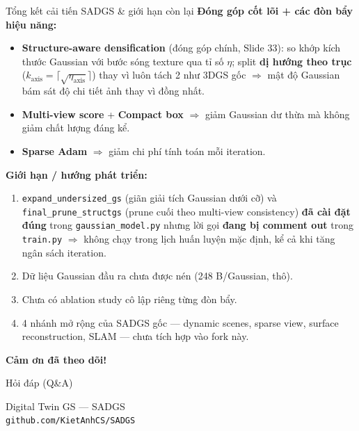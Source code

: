 \begin{frame}{Tổng kết cải tiến SADGS \& giới hạn còn lại}
\footnotesize
\textbf{Đóng góp cốt lõi + các đòn bẩy hiệu năng:}
\begin{itemize}
    \item \textbf{Structure-aware densification} (đóng góp chính, Slide 33): so khớp kích thước Gaussian với bước sóng texture qua tỉ số $\eta$; split \textbf{dị hướng theo trục} ($k_{\text{axis}}=\lceil\sqrt{\eta_{\text{axis}}}\rceil$) thay vì luôn tách 2 như 3DGS gốc $\Rightarrow$ mật độ Gaussian bám sát độ chi tiết ảnh thay vì đồng nhất.
    \item \textbf{Multi-view score} + \textbf{Compact box} $\Rightarrow$ giảm Gaussian dư thừa mà không giảm chất lượng đáng kể.
    \item \textbf{Sparse Adam} $\Rightarrow$ giảm chi phí tính toán mỗi iteration.
\end{itemize}
\vspace{2mm}
\textbf{Giới hạn / hướng phát triển:}
\begin{enumerate}
    \item \texttt{expand\_undersized\_gs} (giãn giải tích Gaussian dưới cỡ) và \texttt{final\_prune\_structgs} (prune cuối theo multi-view consistency) \textbf{đã cài đặt đúng} trong \texttt{gaussian\_model.py} nhưng lời gọi \textbf{đang bị comment out} trong \texttt{train.py} $\Rightarrow$ không chạy trong lịch huấn luyện mặc định, kể cả khi tăng ngân sách iteration.
    \item Dữ liệu Gaussian đầu ra chưa được nén (248 B/Gaussian, thô).
    \item Chưa có ablation study cô lập riêng từng đòn bẩy.
    \item 4 nhánh mở rộng của SADGS gốc — dynamic scenes, sparse view, surface reconstruction, SLAM — chưa tích hợp vào fork này.
\end{enumerate}
\end{frame}

\begin{frame}[c]{}
\centering
{\Huge \textbf{Cảm ơn đã theo dõi!}}

\vspace{6mm}
{\LARGE Hỏi đáp (Q\&A)}

\vspace{10mm}
{\small Digital Twin GS --- SADGS \\ \texttt{github.com/KietAnhCS/SADGS}}
\end{frame}
